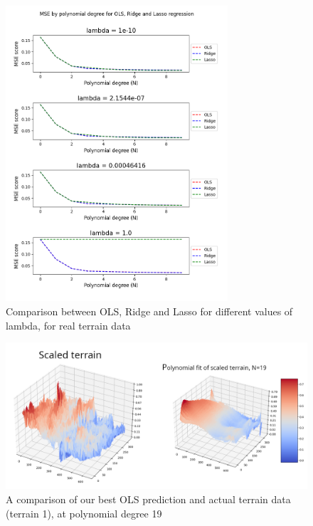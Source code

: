 \documentclass[twocolumn,10pt,cleanfoot]{asme2ej}
\begin{document}
\begin{figure}
\centerline{\includegraphics[width=3.25in]{figure/real1msecomparison.png}}
\caption{Comparison between OLS, Ridge and Lasso for different values of lambda, for real terrain data}
\label{real1msecomparison}
\end{figure}

\begin{figure} 
\centerline{\includegraphics[width=6.85in]{figure/real1surfacecomp.png}}
\caption{A comparison of our best OLS prediction and actual terrain data (terrain 1), at polynomial degree 19}
\label{real1surfacecomp}
\end{figure}
\end{document}
